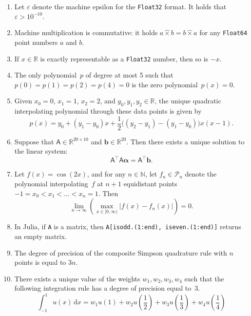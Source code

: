 \documentclass{article}
\newcommand{\julia}[1]{\texttt{#1}}
\begin{document}
\begin{enumerate}

    \item
        Let $\varepsilon$ denote the machine epsilon for the \julia{Float32} format.
        It holds that $\varepsilon > 10^{-10}$.

    \item
        Machine multiplication is commutative:
        it holds $a \widehat \times b = b \widehat \times a$
        for any \julia{Float64} point numbers $a$ and $b$.

    \item
        If $x \in \mathbb R$ is exactly representable as a \julia{Float32} number,
        then so is $-x$.

    \item
        The only polynomial~$p$ of degree at most 5 such that $p(0) = p(1) = p(2) = p(4) = 0$ is the
        zero polynomial~$p(x) = 0$.

    \item
        Given $x_0 = 0$, $x_1 = 1$, $x_2 = 2$,
        and $y_0, y_1, y_2 \in \mathbb R$,
        the unique quadratic interpolating polynomial through these data points is given by
        \[
            p(x) =
            y_0 + (y_1 - y_0)  x  + \frac{1}{2} \bigl((y_2 - y_1) - (y_1 - y_0)\bigr) x(x-1).
        \]

    \item
        Suppose that $\mathsf A \in \mathbb R^{20 \times 10}$ and $\mathbf b \in \mathbb R^{20}$.
        Then there exists a unique solution to the linear system:
        \[
            \mathsf A^\top \mathsf A \boldsymbol \alpha = \mathsf A^\top \mathbf b.
        \]
    \item
        Let $f(x) = \cos(2x)$,
        and for any $n \in \mathbb N$,
        let $f_n \in \mathcal P_n$ denote the polynomial interpolating~$f$ at $n+1$ equidistant points $-1 = x_0 < x_1 < \dotsc < x_n = 1$.
        Then
        \[
            \lim_{n \to \infty} \left( \max_{x \in [0, \infty)} \bigl\lvert f(x) - f_n(x) \bigr\rvert \right) = 0.
        \]

    \item
        In Julia, if \julia{A} is a matrix,
        then \julia{A[isodd.(1:end), iseven.(1:end)]} returns an empty matrix.

    \item
        The degree of precision of the composite Simpson quadrature rule with $n$ points is equal to $3n$.

    \item
        There exists a unique value of the weights $w_1, w_2, w_3, w_4$ such that the following integration rule has a degree of precision equal to~$3$.
        \[
            \int_{-1}^{1} u(x) \, \mathrm d x 
            = w_1 u(1) 
            + w_2 u \left(\frac{1}{2} \right) 
            + w_3 u \left(\frac{1}{3} \right) 
            + w_4 u \left(\frac{1}{4} \right) 
        \]

\end{enumerate}
\end{document}
